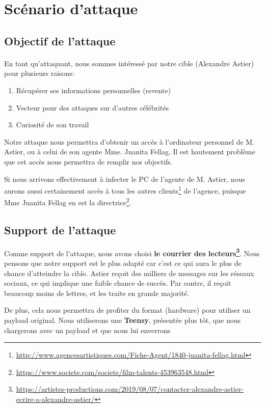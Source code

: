 \section{Scénario d'attaque}

\subsection{Objectif de l'attaque}
\paragraph{} En tant qu'attaquant, nous sommes intéressé par notre cible (Alexandre Astier) pour plusieurs raisons:
\begin{enumerate}
    \item Récupérer ses informations personnelles (revente)
    \item Vecteur pour des attaques sur d'autres célébrités
    \item Curiosité de son travail
\end{enumerate}

Notre attaque nous permettra d'obtenir un accès à l'ordinateur personnel de M. Astier, ou à celui de son agente Mme. Juanita Fellag.
Il est hautement problème que cet accès nous permettra de remplir nos objectifs.

Si nous arrivons effectivement à infecter le PC de l'agente de M. Astier, 
nous aurons aussi certainement accès à tous les autres clients\footnote{\url{http://www.agencesartistiques.com/Fiche-Agent/1840-juanita-fellag.html}} de l'agence, puisque Mme Juanita Fellag en est la directrice\footnote{\url{https://www.societe.com/societe/film-talents-453963548.html}}.

\subsection{Support de l'attaque}

Comme support de l'attaque, nous avons choisi \textbf{le courrier des lecteurs\footnote{\url{https://artistes-productions.com/2019/08/07/contacter-alexandre-astier-ecrire-a-alexandre-astier/}}}.
Nous pensons que notre support est le plus adapté car c'est ce qui aura le plus de chance d'atteindre la cible.
Astier reçoit des milliers de messages sur les réseaux sociaux, ce qui implique une faible chance de succès.
Par contre, il reçoit beaucoup moins de lettres, et les traite en grande majorité.

De plus, cela nous permettra de profiter du format (hardware) pour utiliser un payload original. Nous utiliserons une \textbf{Teensy}, présentée plus tôt, que nous chargerons avec un payload et que nous lui enverrons

